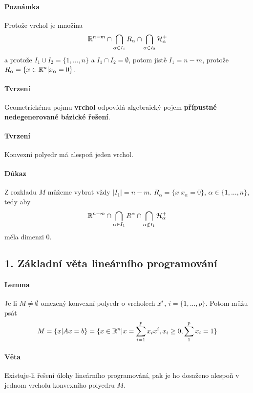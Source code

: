 \documentclass[a4paper,12pt,titlepage]{article}
\begin{document}
\paragraph{Poznámka}
Protože vrchol je množina 
\begin{align}
	\mathbb{R}^{n-m} \cap \bigcap_{\alpha \in I_1} R_\alpha \cap
	\bigcap_{\alpha \in I_2} \mathcal{H}_\alpha^+
\end{align}
a protože $I_1 \cup I_2 = \{ 1, ..., n \}$ a $I_1 \cap I_2 = \emptyset$, potom
jistě $I_1 = n-m$, protože $R_\alpha = \{ x \in \mathbb{R}^n | x_\alpha = 0 \}$.
\paragraph{Tvrzení}
Geometrickému pojmu \textbf{vrchol} odpovídá algebraický pojem \textbf{přípustné nedegenerované
bázické řešení}.
\paragraph{Tvrzení}
Konvexní polyedr má alespoň jeden vrchol.
\paragraph{Důkaz}
Z rozkladu $M$ můžeme vybrat vždy $|I_1| = n-m$. $R_\alpha = \{x | x_\alpha = 0
\}$, $\alpha\in \{1, ..., n \}$, tedy aby
\begin{align}
	\mathbb{R}^{n-m} \cap \bigcap_{\alpha \in I_1} R^\alpha \cap \bigcap_{\alpha \notin
	I_1} \mathcal{H}_\alpha^+
\end{align}
měla dimenzi 0.


\subsection{1. Základní věta lineárního programování}
\setcounter{equation}{0}
\paragraph{Lemma}
Je-li $M \neq \emptyset$ omezený konvexní polyedr o vrcholech $x^i$, $i = \{ 1, ...,
p \}$. Potom můžu psát 
\begin{align}
	M = \{ x | Ax = b\} = \{ x \in \mathbb{R}^n | x = \sum_{i=1}^p x_i x^i, x_i \ge 0, \sum_1^p x_i = 1\}
\end{align}
\paragraph{Věta}
Existuje-li řešení úlohy lineárního programování, pak je ho dosaženo alespoň v
jednom vrcholu konvexního polyedru $M$.
\end{document}
